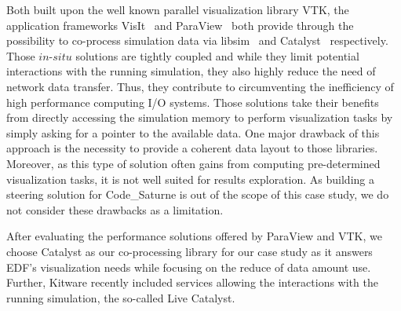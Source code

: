 Both built upon the well known parallel visualization library VTK, 
the application frameworks VisIt~\cite{1532795} and ParaView~\cite{964413} both provide through
the possibility to co-process simulation data via libsim~\cite{2386230} and Catalyst~\cite{6092322} respectively.  
Those $in$-$situ$ solutions are tightly coupled and while they
limit potential interactions with the running simulation, they also highly
reduce the need of network data transfer. Thus, they contribute to circumventing
the inefficiency of high performance computing I/O systems.
Those solutions take their benefits from directly accessing the simulation memory to
perform visualization tasks by simply asking for a pointer to the available
data. One major drawback of this approach is the necessity to provide a coherent data 
layout to those libraries. Moreover, as this type of
solution often gains from computing pre-determined visualization tasks, it is
not well suited for results exploration.  As building a steering solution for Code\_Saturne is out of
the scope of this case study, we do not consider these drawbacks as a limitation. 

After evaluating the performance solutions offered by ParaView and VTK, we choose Catalyst as 
our co-processing library for our case study as it answers EDF's visualization 
needs while focusing on the  reduce of data amount use. %
Further, Kitware recently included services allowing the interactions with the
running simulation, the so-called Live Catalyst.

